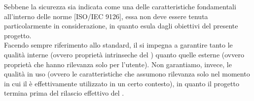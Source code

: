 		Sebbene la sicurezza sia indicata come una delle caratteristiche fondamentali all'interno delle norme [ISO/IEC 9126], essa non deve essere tenuta particolarmente in considerazione, in quanto esula dagli obiettivi del presente progetto.\\
		Facendo sempre riferimento allo standard, il  si impegna a garantire tanto le qualità interne (ovvero proprietà intrinseche del ) quanto quelle esterne (ovvero proprietà che hanno rilevanza solo per l'utente). Non garantiamo, invece, le qualità in uso (ovvero le caratteristiche che assumono rilevanza solo nel momento in cui il  è effettivamente utilizzato in un certo contesto), in quanto il progetto termina prima del rilascio effettivo del .
